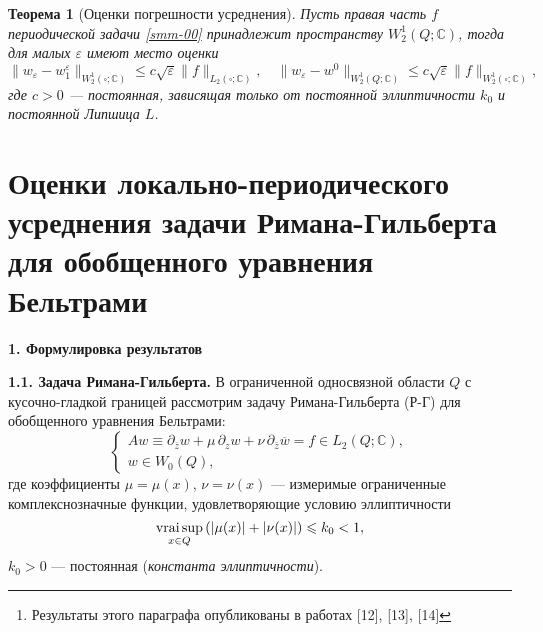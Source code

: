 \documentclass[a4paper,12pt]{article}
\newtheorem{theorem}{Теорема}[section]
\theoremstyle{definition}
\def\<{\left<}
\def\>{\right>}
\begin{document}
\begin{theorem}[Оценки погрешности усреднения]
Пусть правая часть $f$ периодической задачи \eqref{smm-00} принадлежит пространству $W_2^1(Q;\mathbb{C})$, тогда для малых $\varepsilon$ имеют место оценки
		\begin{equation*}
			\|w_\varepsilon-w_1^\varepsilon\|_{W_2^1 (\square; \mathbb{C})}\leqslant c\sqrt{\varepsilon}\|f
			\|_{L_2 (\square; \mathbb{C})}, \quad \|w_\varepsilon-w^0\|_{W_2^1 (Q; \mathbb{C})}\leqslant c\sqrt{\varepsilon}\|f
			\|_{W_2^1 (\square; \mathbb{C})},
		\end{equation*}
		где $c>0$ --- постоянная, зависящая только от постоянной эллиптичности $k_0$ и постоянной Липшица $L$.
\end{theorem}

\section{Оценки локально-периодического усреднения задачи Римана-Гильберта для обобщенного уравнения Бельтрами}	

\begin{abstract}\noindent
	Метод усреднения дифференциальных операторов, основанный на асимптотическом разложении по малому параметру, широко используется  в математической и физической литературе. Этот метод позволяет помимо теоремы усреднения получить
	оценки разности точного решения и его приближений.
	Настоящая работа\footnote{Результаты этого параграфа опубликованы в работах
		[12], [13], [14]} посвящена оценкам погрешности усреднения обобщенного уравнения Бельтрами с локально-периодическими коэффициентами $\mu(x,\varepsilon^{-1} x)$, $\nu(x,\varepsilon^{-1} x)$.
	\medskip\\
	DOI: %
\end{abstract}

\textbf{1. Формулировка результатов}

\smallskip

\textbf{1.1. Задача Римана-Гильберта.} В ограниченной односвязной области $Q$ с кусочно-гладкой границей рассмотрим задачу Римана-Гильберта (Р-Г) для обобщенного уравнения Бельтрами:
\begin{equation}\label{smm-0sirazhf:1.1}
	\left\{\begin{array}{l}
		A w\equiv\partial_{\bar{z}}w+\mu\,\partial_z w+\nu\,\partial_{\bar z}\overline{w}=f\in L_2(Q;\mathbb{C}), \\[3mm]
		w\in W_0(Q),
	\end{array}\right.
\end{equation}
где коэффициенты $\mu=\mu(x)$, $\nu=\nu(x)$ --- измеримые ограниченные комплекснозначные функции, удовлетворяющие условию эллиптичности
\begin{equation}\label{smm-00sirazhf:1.2}
	\mathop{\rm vrai\,sup}_{x\in Q}\left(|\mu(x)|+|\nu(x)|\right)\leqslant k_0 <1,
\end{equation}
$k_0>0$ --- постоянная (\textit{константа эллиптичности}).
\end{document}
